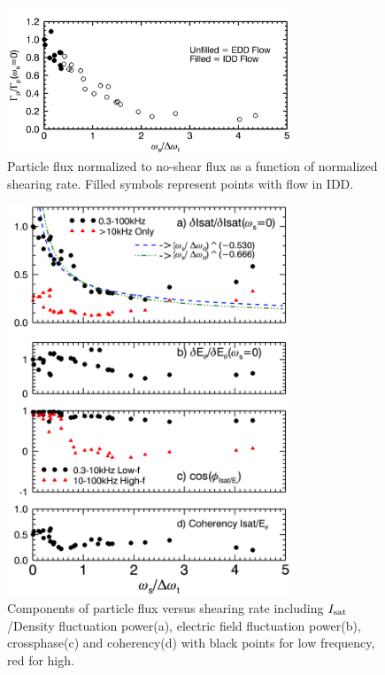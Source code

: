 \documentclass[aps,prl,amsmath,amssymb,preprint,superscriptaddress]{revtex4}
\begin{document}
\begin{figure}
\begin{center}
\includegraphics[width=8.5cm]{fluxvsshear.pdf}%
\caption{\label{fig:fluxvsshear} Particle flux normalized to no-shear flux as a function of normalized shearing rate. Filled symbols represent points with flow in IDD.}
\end{center}
\end{figure}


\begin{figure}
\begin{center}
\includegraphics[width=8.5cm]{fluxcomps.pdf}%
\caption{\label{fig:fluxcomps} Components of particle flux versus shearing rate including $I_{\rm sat}$/Density fluctuation power(a), electric field fluctuation power(b), crossphase(c) and coherency(d) with black points for low frequency, red for high.}
\end{center}
\end{figure}
\end{document}
